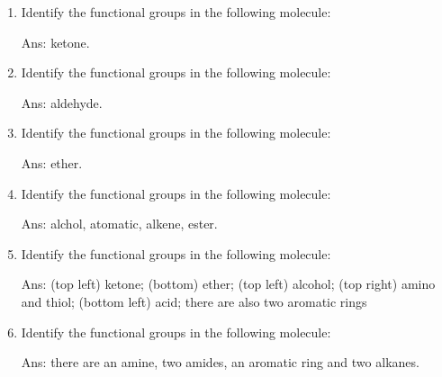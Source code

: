 \documentclass[main.tex]{subfiles}
\begin{document}
\begin{multicols*}{2}
\begin{enumerate}
\item Identify the functional groups in the following molecule:
\begin{center}
\end{center}
\begin{flushright}\small Ans: ketone.\end{flushright}

\item Identify the functional groups in the following molecule:
\begin{center}
\end{center}
\begin{flushright}\small Ans: aldehyde.\end{flushright}

\item Identify the functional groups in the following molecule:
\begin{center}
\end{center}
\begin{flushright}\small Ans: ether.\end{flushright}


\item Identify the functional groups in the following molecule:
\begin{center}
\end{center}
\begin{flushright}\small Ans: alchol, atomatic, alkene, ester.\end{flushright}


\item Identify the functional groups in the following molecule:
\begin{center}\end{center}
\begin{flushright}\small Ans: (top left) ketone; (bottom) ether; (top left) alcohol; (top right) amino and thiol; (bottom left) acid; there are also two aromatic rings\end{flushright}

\item Identify the functional groups in the following molecule:
\begin{center}
\end{center}
\begin{flushright}\small Ans: there are an amine, two amides, an aromatic ring and two alkanes.\end{flushright}





\restoregeometry
\end{enumerate}
\end{multicols*}
\pagecolor{green!10}\afterpage{\nopagecolor}\newpage
\end{document}
